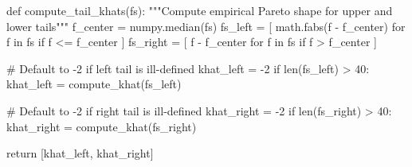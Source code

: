 \documentclass[
  letterpaper,
  DIV=11,
  numbers=noendperiod]{scrartcl}
\newenvironment{Shaded}{\begin{snugshade}}{\end{snugshade}}
\newcommand{\BuiltInTok}[1]{\textcolor[rgb]{0.00,0.23,0.31}{#1}}
\newcommand{\CommentTok}[1]{\textcolor[rgb]{0.37,0.37,0.37}{#1}}
\newcommand{\ControlFlowTok}[1]{\textcolor[rgb]{0.00,0.23,0.31}{#1}}
\newcommand{\DecValTok}[1]{\textcolor[rgb]{0.68,0.00,0.00}{#1}}
\newcommand{\KeywordTok}[1]{\textcolor[rgb]{0.00,0.23,0.31}{#1}}
\newcommand{\NormalTok}[1]{\textcolor[rgb]{0.00,0.23,0.31}{#1}}
\newcommand{\OperatorTok}[1]{\textcolor[rgb]{0.37,0.37,0.37}{#1}}
\begin{document}
\begin{Shaded}
\begin{Highlighting}[]
\KeywordTok{def}\NormalTok{ compute\_tail\_khats(fs):}
  \CommentTok{"""Compute empirical Pareto shape for upper and lower tails"""}
\NormalTok{  f\_center }\OperatorTok{=}\NormalTok{ numpy.median(fs)}
\NormalTok{  fs\_left }\OperatorTok{=}\NormalTok{ [ math.fabs(f }\OperatorTok{{-}}\NormalTok{ f\_center) }\ControlFlowTok{for}\NormalTok{ f }\KeywordTok{in}\NormalTok{ fs }\ControlFlowTok{if}\NormalTok{ f }\OperatorTok{\textless{}=}\NormalTok{ f\_center ]}
\NormalTok{  fs\_right }\OperatorTok{=}\NormalTok{ [ f }\OperatorTok{{-}}\NormalTok{ f\_center }\ControlFlowTok{for}\NormalTok{ f }\KeywordTok{in}\NormalTok{ fs }\ControlFlowTok{if}\NormalTok{ f }\OperatorTok{\textgreater{}}\NormalTok{ f\_center ]}
  
  \CommentTok{\# Default to {-}2 if left tail is ill{-}defined}
\NormalTok{  khat\_left }\OperatorTok{=} \OperatorTok{{-}}\DecValTok{2}
  \ControlFlowTok{if} \BuiltInTok{len}\NormalTok{(fs\_left) }\OperatorTok{\textgreater{}} \DecValTok{40}\NormalTok{:}
\NormalTok{    khat\_left }\OperatorTok{=}\NormalTok{ compute\_khat(fs\_left)}
  
  \CommentTok{\# Default to {-}2 if right tail is ill{-}defined}
\NormalTok{  khat\_right }\OperatorTok{=} \OperatorTok{{-}}\DecValTok{2}
  \ControlFlowTok{if} \BuiltInTok{len}\NormalTok{(fs\_right) }\OperatorTok{\textgreater{}} \DecValTok{40}\NormalTok{:}
\NormalTok{    khat\_right }\OperatorTok{=}\NormalTok{ compute\_khat(fs\_right)}
    
  \ControlFlowTok{return}\NormalTok{ [khat\_left, khat\_right]}
\end{Highlighting}
\end{Shaded}
\end{document}
